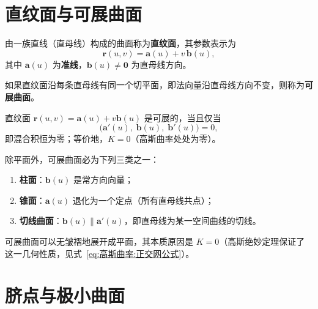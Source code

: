 \section{直纹面与可展曲面}

\begin{definition}[直纹面]
	由一族直线（直母线）构成的曲面称为\textbf{直纹面}，其参数表示为
	\begin{equation}
		\boldsymbol{r}(u,v)=\boldsymbol{a}(u)+v\,\boldsymbol{b}(u),
		\label{eq:直纹面:定义}
	\end{equation}
	其中 $\boldsymbol{a}(u)$ 为\textbf{准线}，$\boldsymbol{b}(u)\neq\boldsymbol{0}$ 为直母线方向。
\end{definition}

\begin{definition}[可展曲面]
	如果直纹面沿每条直母线有同一个切平面，即法向量沿直母线方向不变，则称为\textbf{可展曲面}。
\end{definition}

\begin{theorem}[可展曲面的判别]
	直纹面 $\boldsymbol{r}(u,v)=\boldsymbol{a}(u)+v\boldsymbol{b}(u)$ 是可展的，当且仅当
	\begin{equation}
		\bigl(\boldsymbol{a}'(u),\;\boldsymbol{b}(u),\;\boldsymbol{b}'(u)\bigr)=0,
		\label{eq:可展曲面:判别}
	\end{equation}
	即混合积恒为零；等价地，$K=0$（高斯曲率处处为零）。
\end{theorem}

\begin{theorem}[可展曲面的分类]
	除平面外，可展曲面必为下列三类之一：
	\begin{enumerate}
		\item \textbf{柱面}：$\boldsymbol{b}(u)$ 是常方向向量；
		\item \textbf{锥面}：$\boldsymbol{a}(u)$ 退化为一个定点（所有直母线共点）；
		\item \textbf{切线曲面}：$\boldsymbol{b}(u)\parallel\boldsymbol{a}'(u)$，即直母线为某一空间曲线的切线。
	\end{enumerate}
\end{theorem}

\begin{remark}
	可展曲面可以无皱褶地展开成平面，其本质原因是 $K=0$（高斯绝妙定理保证了这一几何性质，见式~\eqref{eq:高斯曲率:正交网公式}）。
\end{remark}

\section{脐点与极小曲面}

